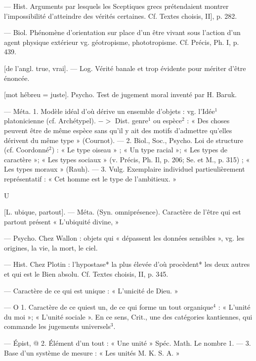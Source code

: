 \begin{itemize}[leftmargin=1cm, label=, itemsep=1pt]
 — Hist. Arguments par lesquels les Sceptiques grecs prétendaient montrer l'impossibilité d’atteindre des vérités certaines. Cf.
Textes choisis, II], p. 282.

 — Biol. Phénomène d'orientation sur place d’un être vivant
sous l’action d’un agent physique
extérieur vg. géotropisme, phototropisme. Cf. Précis, Ph. I,
p. 439.

 [de l’angl. true, vrai]. — Log.
Vérité banale et trop évidente pour
mériter d'être énoncée.

 [mot hébreu = juste]. Psycho.
Test de jugement moral inventé
par H. Baruk.

 — Méta. 1. Modèle idéal d’où
dérive un ensemble d'objets : vg.
l’Idée$^1$ platonicienne (cf. Archétypel). $->$ Dist. genre$^1$ ou espèce$^2$ :
« Des choses peuvent être de même
espèce sans qu'il y ait des motifs
d'admettre qu'elles dérivent du
même type » (Cournot). — 2. Biol.,
Soc., Psycho. Loi de structure (cf.
Coordonné$^2$) : « Le type oiseau » ; « Un
type racial »; « Les types de caractère »; « Les types sociaux » (v. Précis,
Ph. Il, p. 206; Se. et M., p. 315) ;
« Les types moraux » (Rauh). —
3. Vulg. Exemplaire individuel partieulièrement représentatif : « Cet
homme est le type de l’ambitieux. »

\begin{center}
U
\end{center}

 [L. ubique, partout]. — Méta.
(Syn. omniprésence). Caractère de
l'être qui est partout présent
« L’ubiquité divine, »

 — Psycho. Chez Wallon :
objets qui « dépassent les données
sensibles », vg. les origines, la vie, la
mort, le ciel.

 — Hist. Chez Plotin : l'hypostase* la plus élevée d’où procèdent*
les deux autres et qui est le Bien
absolu. Cf. Textes choisis, II, p. 345.

 — Caractère de ce qui est
unique : « L’unicité de Dieu. »

 — O 1. Caractère de ce quiest un,
de ce qui forme un tout organique$^4$ :
« L'unité du moi »; « L'unité sociale ».
En ce sens, Crit., une des catégories
kantiennes, qui commande les jugements universels$^3$.

— Épist, @ 2. Élément d’un tout :
« Une unité » Spéc. Math. Le
nombre 1. — 3. Base d’un système
de mesure : « Les unités M. K. S. A. »


\end{itemize}
